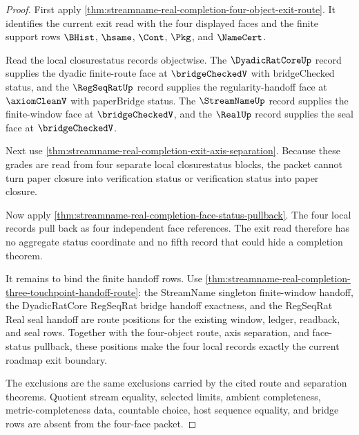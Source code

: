 \begin{proof}
First apply \autoref{thm:streamname-real-completion-four-object-exit-route}. It identifies the current exit read with the four displayed faces and the finite support rows $\BHist$, $\hsame$, $\Cont$, $\Pkg$, and $\NameCert$.

Read the local closurestatus records objectwise. The $\DyadicRatCoreUp$ record supplies the dyadic finite-route face at $\bridgeCheckedV$ with bridgeChecked status, and the $\RegSeqRatUp$ record supplies the regularity-handoff face at $\axiomCleanV$ with paperBridge status. The $\StreamNameUp$ record supplies the finite-window face at $\bridgeCheckedV$, and the $\RealUp$ record supplies the seal face at $\bridgeCheckedV$.

Next use \autoref{thm:streamname-real-completion-exit-axis-separation}. Because these grades are read from four separate local closurestatus blocks, the packet cannot turn paper closure into verification status or verification status into paper closure.

Now apply \autoref{thm:streamname-real-completion-face-status-pullback}. The four local records pull back as four independent face references. The exit read therefore has no aggregate status coordinate and no fifth record that could hide a completion theorem.

It remains to bind the finite handoff rows. Use \autoref{thm:streamname-real-completion-three-touchpoint-handoff-route}: the StreamName singleton finite-window handoff, the DyadicRatCore RegSeqRat bridge handoff exactness, and the RegSeqRat Real seal handoff are route positions for the existing window, ledger, readback, and seal rows. Together with the four-object route, axis separation, and face-status pullback, these positions make the four local records exactly the current roadmap exit boundary.

The exclusions are the same exclusions carried by the cited route and separation theorems. Quotient stream equality, selected limits, ambient completeness, metric-completeness data, countable choice, host sequence equality, and bridge rows are absent from the four-face packet.
\end{proof}

